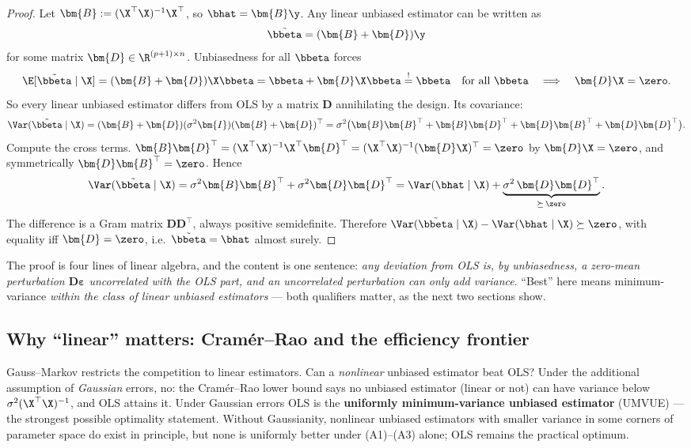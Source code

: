 \begin{proof}
Let $\bm{B} := (\X^\top\X)^{-1}\X^\top$, so $\bhat = \bm{B}\y$. Any linear unbiased estimator can be written as
\[
  \tilde{\bbeta} = (\bm{B} + \bm{D}) \y
\]
for some matrix $\bm{D} \in \R^{(p+1) \times n}$. Unbiasedness for all $\bbeta$ forces
\[
  \E[\tilde{\bbeta}\mid\X] = (\bm{B} + \bm{D})\X\bbeta = \bbeta + \bm{D}\X\bbeta \stackrel{!}{=} \bbeta
  \quad \text{for all } \bbeta
  \quad\Longrightarrow\quad
  \bm{D}\X = \zero.
\]
So every linear unbiased estimator differs from OLS by a matrix $\bm{D}$ annihilating the design. Its covariance:
\[
  \Var(\tilde{\bbeta}\mid\X) = (\bm{B}+\bm{D})(\sigma^2\bm{I})(\bm{B}+\bm{D})^\top
  = \sigma^2 \big( \bm{B}\bm{B}^\top + \bm{B}\bm{D}^\top + \bm{D}\bm{B}^\top + \bm{D}\bm{D}^\top \big).
\]
Compute the cross terms. $\bm{B}\bm{D}^\top = (\X^\top\X)^{-1}\X^\top \bm{D}^\top = (\X^\top\X)^{-1}(\bm{D}\X)^\top = \zero$ by $\bm{D}\X = \zero$, and symmetrically $\bm{D}\bm{B}^\top = \zero$. Hence
\[
  \Var(\tilde{\bbeta}\mid\X) = \sigma^2 \bm{B}\bm{B}^\top + \sigma^2 \bm{D}\bm{D}^\top
  = \Var(\bhat \mid \X) + \underbrace{\sigma^2 \, \bm{D}\bm{D}^\top}_{\succeq\, \zero}.
\]
The difference is a Gram matrix $\bm{D}\bm{D}^\top$, always positive semidefinite. Therefore $\Var(\tilde{\bbeta}\mid\X) - \Var(\bhat\mid\X) \succeq \zero$, with equality iff $\bm{D} = \zero$, i.e.\ $\tilde{\bbeta} = \bhat$ almost surely.
\end{proof}

\begin{intuition}
The proof is four lines of linear algebra, and the content is one sentence: \emph{any deviation from OLS is, by unbiasedness, a zero-mean perturbation $\bm{D}\bm{\varepsilon}$ uncorrelated with the OLS part, and an uncorrelated perturbation can only add variance}. ``Best'' here means minimum-variance \emph{within the class of linear unbiased estimators} — both qualifiers matter, as the next two sections show.
\end{intuition}

\subsection{Why ``linear'' matters: Cram\'er--Rao and the efficiency frontier}

Gauss--Markov restricts the competition to linear estimators. Can a \emph{nonlinear} unbiased estimator beat OLS? Under the additional assumption of \emph{Gaussian} errors, no: the Cram\'er--Rao lower bound says no unbiased estimator (linear or not) can have variance below $\sigma^2(\X^\top\X)^{-1}$, and OLS attains it. Under Gaussian errors OLS is the \textbf{uniformly minimum-variance unbiased estimator} (UMVUE) — the strongest possible optimality statement. Without Gaussianity, nonlinear unbiased estimators with smaller variance in some corners of parameter space do exist in principle, but none is uniformly better under (A1)--(A3) alone; OLS remains the practical optimum.

